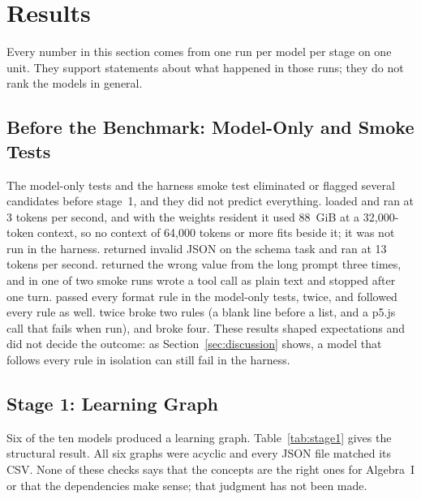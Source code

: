 \section{Results}
\label{sec:results}

Every number in this section comes from one run per model per stage on one unit. They support statements about what happened in those runs; they do not rank the models in general.

\subsection{Before the Benchmark: Model-Only and Smoke Tests}

The model-only tests and the harness smoke test eliminated or flagged several candidates before stage~1, and they did not predict everything. \Mistral{} loaded and ran at 3 tokens per second, and with the weights resident it used 88~GiB at a 32,000-token context, so no context of 64,000 tokens or more fits beside it; it was not run in the harness. \Muse{} returned invalid JSON on the schema task and ran at 13 tokens per second. \Gptoss{} returned the wrong value from the long prompt three times, and in one of two smoke runs wrote a tool call as plain text and stopped after one turn. \Gthirtyone{} passed every format rule in the model-only tests, twice, and \Qeight{} followed every rule as well. \Gtwentysix{} twice broke two rules (a blank line before a list, and a p5.js call that fails when run), and \Nemo{} broke four. These results shaped expectations and did not decide the outcome: as Section~\ref{sec:discussion} shows, a model that follows every rule in isolation can still fail in the harness.

\subsection{Stage 1: Learning Graph}

Six of the ten models produced a learning graph. Table~\ref{tab:stage1} gives the structural result. All six graphs were acyclic and every JSON file matched its CSV. None of these checks says that the concepts are the right ones for Algebra~I or that the dependencies make sense; that judgment has not been made.

